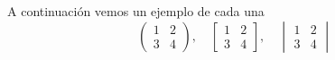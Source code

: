 \documentclass{article}
\begin{document}
A continuación vemos un ejemplo de cada una
	$$	\begin{pmatrix}
			1	&	2	\\
			3	&	4
		\end{pmatrix}, \quad %
		\begin{bmatrix}
			1	&	2	\\
			3	&	4
		\end{bmatrix}, \quad
		\begin{vmatrix}
			1	&	2	\\
			3	&	4
		\end{vmatrix}
	$$
\end{document}
